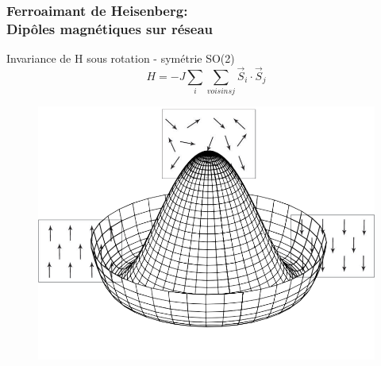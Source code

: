 \documentclass[handout]{beamer}
\begin{document}
\begin{frame}
\frametitle{Ferroaimant de Heisenberg: \\ Dipôles magnétiques sur réseau}
Invariance de H sous rotation - symétrie SO(2)\\
\begin{equation*}
H= -J\sum_{i}{\sum_{voisins j}{\vec{S}_i\cdot\vec{S}_j}}
\end{equation*} 
 \begin{figure}[0.5\textwidth]
   \includegraphics[scale=0.25]{potpot.png}

 \end{figure}

\end{frame}
%
%    
\end{document}
